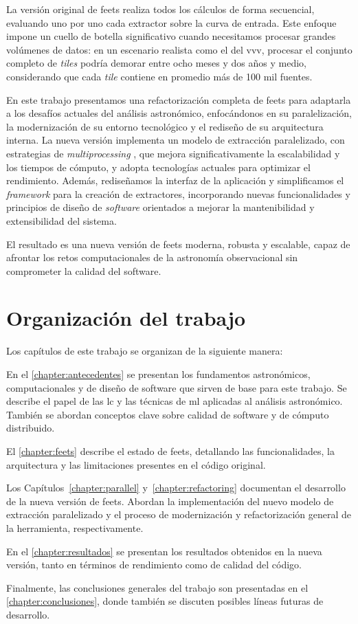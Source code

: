 La versión original de \gls{feets} realiza todos los cálculos de forma secuencial, evaluando uno por uno cada extractor sobre la curva de entrada. Este enfoque impone un cuello de botella significativo cuando necesitamos procesar grandes volúmenes de datos: en un escenario realista como el del \gls{vvv}, procesar el conjunto completo de \emph{tiles} podría demorar entre ocho meses y dos años y medio, considerando que cada \emph{tile} contiene en promedio más de 100 mil fuentes.

En este trabajo presentamos una refactorización  \citep{fowler1999refactoring} completa de \gls{feets} para adaptarla a los desafíos actuales del análisis astronómico, enfocándonos en su paralelización, la modernización de su entorno tecnológico y el rediseño de su arquitectura interna. La nueva versión implementa un modelo de extracción paralelizado, con estrategias de \emph{multiprocessing} \citep{baer1976multiprocessing}, que mejora significativamente la escalabilidad y los tiempos de cómputo, y adopta tecnologías actuales para optimizar el rendimiento. Además, rediseñamos la interfaz de la aplicación y simplificamos el \emph{framework} para la creación de extractores, incorporando nuevas funcionalidades y principios de diseño de \emph{software} orientados a mejorar la mantenibilidad y extensibilidad del sistema.

El resultado es una nueva versión de \gls{feets} moderna, robusta y escalable, capaz de afrontar los retos computacionales de la astronomía observacional sin comprometer la calidad del software.

\section{Organización del trabajo}

Los capítulos de este trabajo se organizan de la siguiente manera:

En el \autoref{chapter:antecedentes} se presentan los fundamentos astronómicos, computacionales y de diseño de software que sirven de base para este trabajo. Se describe el papel de las \gls{lc} y las técnicas de \gls{ml} aplicadas al análisis astronómico. También se abordan conceptos clave sobre calidad de software y de cómputo distribuido. 

El \autoref{chapter:feets} describe el estado de \gls{feets}, detallando las funcionalidades, la arquitectura y las limitaciones presentes en el código original. 

Los Capítulos~\ref{chapter:parallel} y~\ref{chapter:refactoring} documentan el desarrollo de la nueva versión de \gls{feets}. Abordan la implementación del nuevo modelo de extracción paralelizado y el proceso de modernización y refactorización general de la herramienta, respectivamente.

En el \autoref{chapter:resultados} se presentan los resultados obtenidos en la nueva versión, tanto en términos de rendimiento como de calidad del código.

Finalmente, las conclusiones generales del trabajo son presentadas en el \autoref{chapter:conclusiones}, donde también se discuten posibles líneas futuras de desarrollo.


